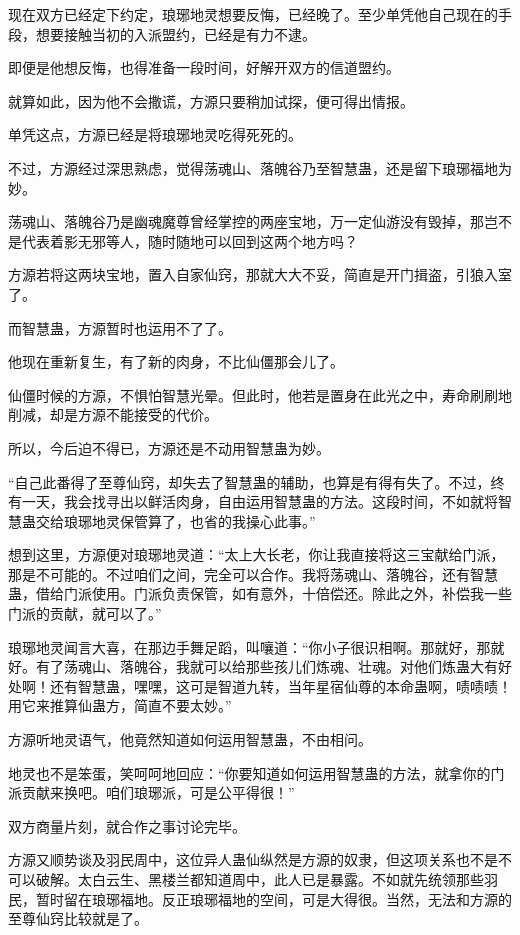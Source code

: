 \begin{this_body}
现在双方已经定下约定，琅琊地灵想要反悔，已经晚了。至少单凭他自己现在的手段，想要接触当初的入派盟约，已经是有力不逮。

即便是他想反悔，也得准备一段时间，好解开双方的信道盟约。

就算如此，因为他不会撒谎，方源只要稍加试探，便可得出情报。

单凭这点，方源已经是将琅琊地灵吃得死死的。

不过，方源经过深思熟虑，觉得荡魂山、落魄谷乃至智慧蛊，还是留下琅琊福地为妙。

荡魂山、落魄谷乃是幽魂魔尊曾经掌控的两座宝地，万一定仙游没有毁掉，那岂不是代表着影无邪等人，随时随地可以回到这两个地方吗？

方源若将这两块宝地，置入自家仙窍，那就大大不妥，简直是开门揖盗，引狼入室了。

而智慧蛊，方源暂时也运用不了了。

他现在重新复生，有了新的肉身，不比仙僵那会儿了。

仙僵时候的方源，不惧怕智慧光晕。但此时，他若是置身在此光之中，寿命刷刷地削减，却是方源不能接受的代价。

所以，今后迫不得已，方源还是不动用智慧蛊为妙。

“自己此番得了至尊仙窍，却失去了智慧蛊的辅助，也算是有得有失了。不过，终有一天，我会找寻出以鲜活肉身，自由运用智慧蛊的方法。这段时间，不如就将智慧蛊交给琅琊地灵保管算了，也省的我操心此事。”

想到这里，方源便对琅琊地灵道：“太上大长老，你让我直接将这三宝献给门派，那是不可能的。不过咱们之间，完全可以合作。我将荡魂山、落魄谷，还有智慧蛊，借给门派使用。门派负责保管，如有意外，十倍偿还。除此之外，补偿我一些门派的贡献，就可以了。”

琅琊地灵闻言大喜，在那边手舞足蹈，叫嚷道：“你小子很识相啊。那就好，那就好。有了荡魂山、落魄谷，我就可以给那些孩儿们炼魂、壮魂。对他们炼蛊大有好处啊！还有智慧蛊，嘿嘿，这可是智道九转，当年星宿仙尊的本命蛊啊，啧啧啧！用它来推算仙蛊方，简直不要太妙。”

方源听地灵语气，他竟然知道如何运用智慧蛊，不由相问。

地灵也不是笨蛋，笑呵呵地回应：“你要知道如何运用智慧蛊的方法，就拿你的门派贡献来换吧。咱们琅琊派，可是公平得很！”

双方商量片刻，就合作之事讨论完毕。

方源又顺势谈及羽民周中，这位异人蛊仙纵然是方源的奴隶，但这项关系也不是不可以破解。太白云生、黑楼兰都知道周中，此人已是暴露。不如就先统领那些羽民，暂时留在琅琊福地。反正琅琊福地的空间，可是大得很。当然，无法和方源的至尊仙窍比较就是了。


\end{this_body}
